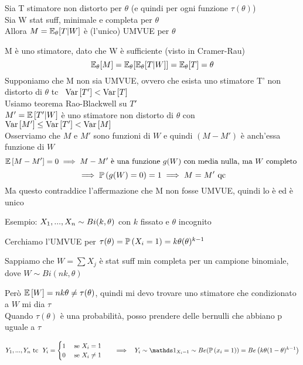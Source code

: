 \begin{teo}
    Sia T stimatore non distorto per $\theta$ (e quindi per ogni funzione $\tau(\theta)$)\\
    Sia W stat suff, minimale e completa per $\theta$\\
    Allora $M=\mathbb E_{\theta}[T|W]$ è (l'unico) UMVUE per $\theta$
\end{teo}





\begin{Dim}
    M è uno stimatore, dato che W è sufficiente (visto in Cramer-Rau)
    \[
    \mathbb E_{\theta}[M]=\mathbb E_{\theta}[\mathbb E_{\theta}[T|W]]= \mathbb E_{\theta}[T]=\theta
    \]
    Supponiamo che M non sia UMVUE, ovvero che esista uno stimatore T' non distorto di $\theta$ tc \ $\text{Var} \left[ T' \right]<\text{Var} \left[ T \right]$\\
    Usiamo teorema Rao-Blackwell su $T'$\\
    $M'=\mathbb{E} \left[ T'|W \right]$ è uno stimatore non distorto di $\theta$ con $\text{Var} \left[ M' \right]\le\text{Var} \left[ T' \right]<\text{Var} \left[ M \right]$\\

    Osserviamo che $M$ e $M'$ sono funzioni di $W$ e quindi $(M-M')$ è anch'essa funzione di $W$
    \[
    \mathbb{E} \left[ M-M' \right]=0 \implies M-M' \text{ è una funzione } g(W) \text{ con media nulla, ma $W$ completo }\]
    \[\implies \mathbb{P} \left( g(W)=0 \right)=1 \implies M=M' \text{ qc}
    \]
    Ma questo contraddice l'affermazione che M non fosse UMVUE, quindi lo è ed è unico\\
\end{Dim}



Esempio: $X_1,...,X_n\sim Bi(k,\theta)$ con $k$ fissato e $\theta$ incognito

Cerchiamo l'UMVUE per $\tau(\theta)=\mathbb{P} \left( X_i=1 \right)=k\theta(\-\theta)^{k-1}$

Sappiamo che $W=\sum X_j$ è stat suff min completa per un campione binomiale, dove $W\sim Bi(nk,\theta)$

Però $\mathbb{E} \left[ W \right]=nk\theta \ne \tau(\theta)$, quindi mi devo trovare uno stimatore che condizionato a $W$ mi dia $\tau$\\

Quando $\tau (\theta)$ è una probabilità, posso prendere delle bernulli che abbiano p uguale a $\tau$

\[
Y_1,...,Y_n \text{ tc } \   Y_i=\begin{cases}
    1 \ \ \ \text{ se } X_i=1\\
    0 \ \ \ \text{ se } X_i\ne 1
\end{cases} \ \ \implies \ \ Y_i\sim \II_{X_i=1} \sim Be (\prob{x_i=1}) = Be\O k\theta(1-\theta)^{k-1}\C
\]


